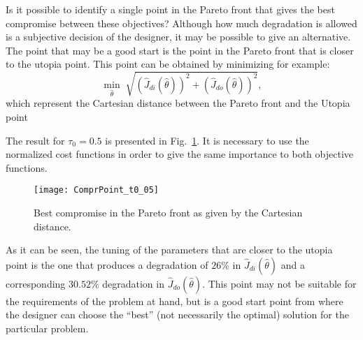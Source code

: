 Is it possible to identify a single point in the Pareto front that gives the best compromise between these objectives? Although how much degradation is allowed is a subjective decision of the designer, it may be possible to give an alternative. The point that may be a good start is the point in the Pareto front that is closer to the utopia point. This point can be obtained by minimizing for example:
%
\begin{equation}
\min_{\hat{\theta}}{\; \sqrt{\left( \hat{J}_{di}(\hat{\theta})\right) ^2+\left( \hat{J}_{do}(\hat{\theta})\right)^2}},
\label{eq:Compr}
\end{equation}
%
which represent the Cartesian distance between the Pareto front and the Utopia point

The result for $\tau_0=0.5$ is presented in Fig.~\ref{fig:ComprPoint_t0_05}. It is necessary to use the normalized cost functions in order to give the same importance to both objective functions. 
%
\begin{figure}[tb]
\centering
\texttt{[image: ComprPoint\_t0\_05]}
\caption{Best compromise in the Pareto front as given by the Cartesian distance.}
\label{fig:ComprPoint_t0_05}
\end{figure}
As it can be seen, the tuning of the parameters that are closer to the utopia point is the one that produces a degradation of $26\%$ in $\hat{J}_{di}(\hat{\theta})$ and a corresponding $30.52\%$ degradation in $\hat{J}_{do}(\hat{\theta})$. This point may not be suitable for the requirements of the problem at hand, but is a good start point from where the designer can choose the ``best'' (not necessarily the optimal) solution for the particular problem.

